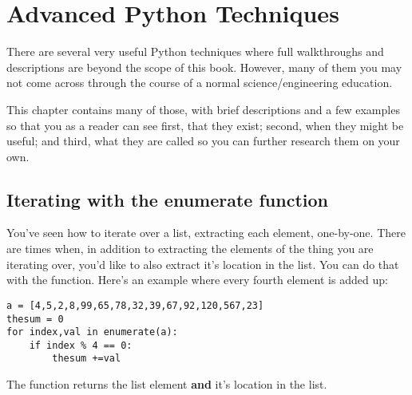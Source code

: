 \chapter{Advanced Python Techniques}
There are several very useful Python techniques where full walkthroughs and descriptions are beyond the scope of this book.  However, many of them you may not come across through the course of a normal science/engineering education.

This chapter contains many of those, with brief descriptions and a few examples so that you as a reader can see first, that they exist; second, when they might be useful; and third, what they are called so you can further research them on your own.

\section{Iterating with the enumerate function}
You've seen how to iterate over a list, extracting each element,
one-by-one.  There are times when, in addition to extracting the
elements of the thing you are iterating over, you'd like to also
extract it's location in the list.  You can do that with the
 function.  Here's an example where every fourth
element is added up:
\begin{Verbatim}
a = [4,5,2,8,99,65,78,32,39,67,92,120,567,23]
thesum = 0
for index,val in enumerate(a):
    if index % 4 == 0:
        thesum +=val
\end{Verbatim}
The function  returns the list element \textbf{and}
it's location in the list.
